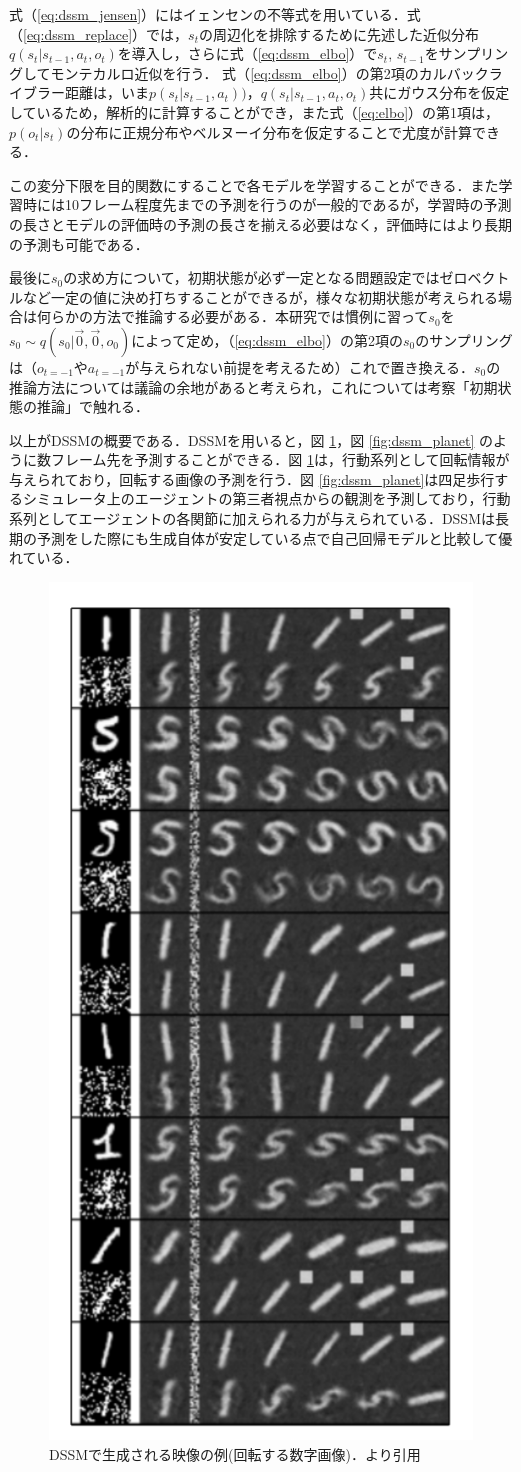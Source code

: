 式（\ref{eq:dssm_jensen}）にはイェンセンの不等式を用いている．式（\ref{eq:dssm_replace}）では，$s_t$の周辺化を排除するために先述した近似分布$q(s_t|s_{t-1}, a_t, o_t)$を導入し，さらに式（\ref{eq:dssm_elbo}）で$s_t$, $s_{t-1}$をサンプリングしてモンテカルロ近似を行う．
式（\ref{eq:dssm_elbo}）の第2項のカルバックライブラー距離は，いま$p(s_t|s_{t-1}, a_t))$，$q(s_t|s_{t-1}, a_t, o_t)$共にガウス分布を仮定しているため，解析的に計算することができ，また式（\ref{eq:elbo}）の第1項は，$p(o_t|s_t)$の分布に正規分布やベルヌーイ分布を仮定することで尤度が計算できる．

この変分下限を目的関数にすることで各モデルを学習することができる．また学習時には10フレーム程度先までの予測を行うのが一般的であるが，学習時の予測の長さとモデルの評価時の予測の長さを揃える必要はなく，評価時にはより長期の予測も可能である．

最後に$s_0$の求め方について，初期状態が必ず一定となる問題設定ではゼロベクトルなど一定の値に決め打ちすることができるが，様々な初期状態が考えられる場合は何らかの方法で推論する必要がある．本研究では慣例に習って$s_0$を$s_0 \sim q(s_0|\vec{0}, \vec{0}, o_0) $によって定め，（\ref{eq:dssm_elbo}）の第2項の$s_0$のサンプリングは（$o_{t=-1}$や$a_{t=-1}$が与えられない前提を考えるため）これで置き換える．$s_0$の推論方法については議論の余地があると考えられ，これについては考察「初期状態の推論」で触れる．

\vspace{\baselineskip}
以上がDSSMの概要である．DSSMを用いると，図 \ref{fig:dssm_dkf}，図 \ref{fig:dssm_planet} のように数フレーム先を予測することができる．図 \ref{fig:dssm_dkf}は，行動系列として回転情報が与えられており，回転する画像の予測を行う．図 \ref{fig:dssm_planet}は四足歩行するシミュレータ上のエージェントの第三者視点からの観測を予測しており，行動系列としてエージェントの各関節に加えられる力が与えられている．DSSMは長期の予測をした際にも生成自体が安定している点で自己回帰モデルと比較して優れている．

\begin{figure}[h]
  \begin{center}
    \includegraphics[width=0.20\linewidth]{./figures/dssm_dkf.png}
    \caption[DSSMで生成される映像の例(回転する数字画像)]{DSSMで生成される映像の例(回転する数字画像)．\cite{krishnan2015deep}より引用}
    \label{fig:dssm_dkf}
  \end{center}
\end{figure}


